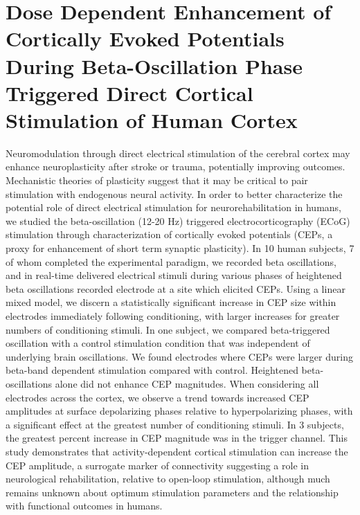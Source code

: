 
 
 
\chapter {Dose Dependent Enhancement of Cortically Evoked Potentials During Beta-Oscillation Phase Triggered Direct Cortical Stimulation of Human Cortex}

Neuromodulation through direct electrical stimulation of the cerebral cortex may enhance neuroplasticity after stroke or trauma, potentially improving outcomes. Mechanistic theories of plasticity suggest that it may be critical to pair stimulation with endogenous neural activity. In order to better characterize the potential role of direct electrical stimulation for neurorehabilitation in humans, we studied the beta-oscillation (12-20 Hz) triggered electrocorticography (ECoG) stimulation through characterization of cortically evoked potentials (CEPs, a proxy for enhancement of short term synaptic plasticity). In 10 human subjects, 7 of whom completed the experimental paradigm, we recorded beta oscillations, and in real-time delivered electrical stimuli during various phases of heightened beta oscillations recorded electrode at a site which elicited CEPs. Using a linear mixed model, we discern a statistically significant increase in CEP size within electrodes immediately following conditioning, with larger increases for greater numbers of conditioning stimuli. In one subject, we compared beta-triggered oscillation with a control stimulation condition that was independent of underlying brain oscillations. We found electrodes where CEPs were larger during beta-band dependent stimulation compared with control. Heightened beta-oscillations alone did not enhance CEP magnitudes. When considering all electrodes across the cortex, we observe a trend towards increased CEP amplitudes at surface depolarizing phases relative to hyperpolarizing phases, with a significant effect at the greatest number of conditioning stimuli. In 3 subjects, the greatest percent increase in CEP magnitude was in the trigger channel. This study demonstrates that activity-dependent cortical stimulation can increase the CEP amplitude, a surrogate marker of connectivity suggesting a role in neurological rehabilitation, relative to open-loop stimulation, although much remains unknown about optimum stimulation parameters and the relationship with functional outcomes in humans.

